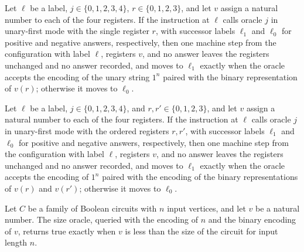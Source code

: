 \begin{lemma}
\leanok
{}
Let $\ell$ be a label, $j\in\{0,1,2,3,4\}$, $r\in\{0,1,2,3\}$, and let $v$ assign a
natural number to each of the four registers. If the instruction at $\ell$ calls oracle
$j$ in unary-first mode with the single register $r$, with successor labels $\ell_1$ and
$\ell_0$ for positive and negative answers, respectively, then one machine step from the
configuration with label $\ell$, registers $v$, and no answer leaves the registers
unchanged and no answer recorded, and moves to $\ell_1$ exactly when the oracle accepts
the encoding of the unary string $1^n$ paired with the binary representation of $v(r)$;
otherwise it moves to $\ell_0$.
\end{lemma}

\begin{lemma}
\leanok
{}
Let $\ell$ be a label, $j\in\{0,1,2,3,4\}$, and $r,r'\in\{0,1,2,3\}$, and let $v$ assign
a natural number to each of the four registers. If the instruction at $\ell$ calls
oracle $j$ in unary-first mode with the ordered registers $r,r'$, with successor labels
$\ell_1$ and $\ell_0$ for positive and negative answers, respectively, then one machine
step from the configuration with label $\ell$, registers $v$, and no answer leaves the
registers unchanged and no answer recorded, and moves to $\ell_1$ exactly when the
oracle accepts the encoding of $1^n$ paired with the encoding of the binary
representations of $v(r)$ and $v(r')$; otherwise it moves to $\ell_0$.
\end{lemma}

\begin{lemma}
\label{BoolCircuit.AdjWalk.orc_size}
\leanok
{}
Let $C$ be a family of Boolean circuits with $n$ input vertices, and let $v$ be a
natural number. The size oracle, queried with the encoding of $n$ and the binary
encoding of $v$, returns true exactly when $v$ is less than the size of the circuit for
input length $n$.
\end{lemma}


